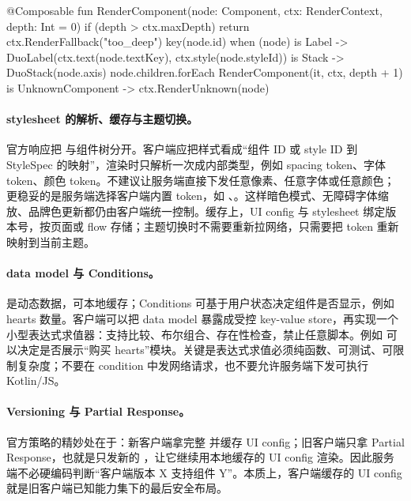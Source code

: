 \begin{kotlin}
@Composable
fun RenderComponent(node: Component, ctx: RenderContext, depth: Int = 0) {
    if (depth > ctx.maxDepth) return ctx.RenderFallback("too_deep")
    key(node.id) {
        when (node) {
            is Label -> DuoLabel(ctx.text(node.textKey), ctx.style(node.styleId))
            is Stack -> DuoStack(node.axis) {
                node.children.forEach { RenderComponent(it, ctx, depth + 1) }
            }
            is UnknownComponent -> ctx.RenderUnknown(node)
        }
    }
}
\end{kotlin}

\paragraph{stylesheet 的解析、缓存与主题切换。} \srcofficial 官方响应把  与组件树分开。客户端应把样式看成“组件 ID 或 style ID 到 StyleSpec 的映射”，渲染时只解析一次成内部类型，例如 spacing token、字体 token、颜色 token。\srcinferred 不建议让服务端直接下发任意像素、任意字体或任意颜色；更稳妥的是服务端选择客户端内置 token，如 、。这样暗色模式、无障碍字体缩放、品牌色更新都仍由客户端统一控制。缓存上，UI config 与 stylesheet 绑定版本号，按页面或 flow 存储；主题切换时不需要重新拉网络，只需要把 token 重新映射到当前主题。

\paragraph{data model 与 Conditions。} \srcofficial {} 是动态数据，可本地缓存；Conditions 可基于用户状态决定组件是否显示，例如 hearts 数量。客户端可以把 data model 暴露成受控 key-value store，再实现一个小型表达式求值器：支持比较、布尔组合、存在性检查，禁止任意脚本。\srcinferred 例如  可以决定是否展示“购买 hearts”模块。关键是表达式求值必须纯函数、可测试、可限制复杂度；不要在 condition 中发网络请求，也不要允许服务端下发可执行 Kotlin/JS。

\paragraph{Versioning 与 Partial Response。} \srcofficial 官方策略的精妙处在于：新客户端拿完整  并缓存 UI config；旧客户端只拿 Partial Response，也就是只发新的 ，让它继续用本地缓存的 UI config 渲染。因此服务端不必硬编码判断“客户端版本 X 支持组件 Y”。本质上，客户端缓存的 UI config 就是旧客户端已知能力集下的最后安全布局。

